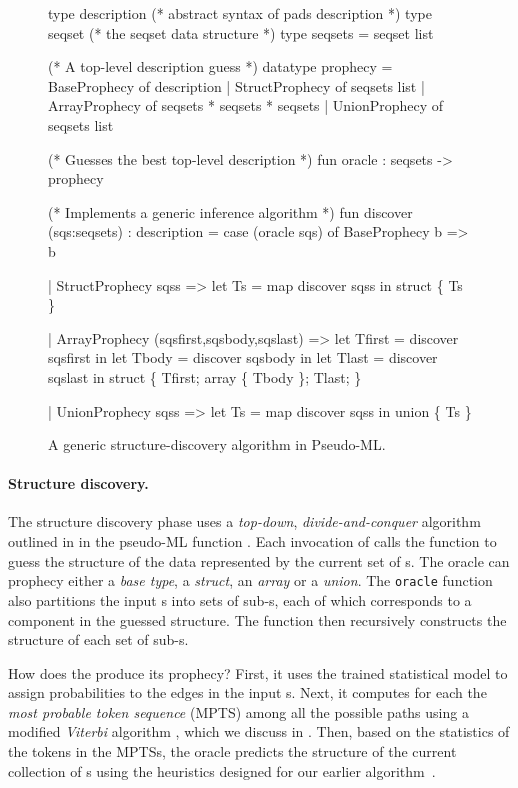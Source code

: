 \begin{figure}[t]
\begin{centercode}
type description  (* abstract syntax of pads description *)
type seqset       (* the seqset data structure *)
type seqsets = seqset list

(* A top-level description guess *)
datatype prophecy =
   BaseProphecy   of description
 | StructProphecy of seqsets list 
 | ArrayProphecy  of seqsets * seqsets * seqsets
 | UnionProphecy  of seqsets list

(* Guesses the best top-level description *)
fun oracle : seqsets -> prophecy

(* Implements a generic inference algorithm *)
fun discover (sqs:seqsets) : description =
 case (oracle sqs) of
   BaseProphecy b => b

 | StructProphecy sqss => 
     let Ts = map discover sqss in
     struct \{ Ts \}

 | ArrayProphecy (sqsfirst,sqsbody,sqslast) => 
     let Tfirst = discover sqsfirst in
     let Tbody  = discover sqsbody  in
     let Tlast  = discover sqslast  in
     struct \{ Tfirst; array \{ Tbody \}; Tlast; \}

 | UnionProphecy sqss => 
     let Ts = map discover sqss in
     union \{ Ts \}
\end{centercode}
\caption{A generic structure-discovery algorithm in Pseudo-ML.} 
\label{fig:structure-discovery}
\end{figure}

\paragraph*{Structure discovery.}
The structure discovery phase uses a {\em top-down}, {\em
divide-and-conquer} algorithm outlined in 
 in the pseudo-ML function
.  Each invocation of 
calls the  function to guess the structure of the data represented
by the current set of \seqset{}s.  The oracle can prophecy
either a {\em base type}, a {\em struct}, an {\em array} or a {\em union}.
The {\tt oracle} function also partitions the input \seqset{}s into
sets of sub-\seqset{}s, each of which corresponds to a component in
the guessed structure.  The  function then recursively 
constructs the structure of each set of sub-\seqset{}s.

How does the  produce its prophecy?
First, it uses the trained statistical model to assign probabilities
to the edges in the input \seqset{}s.
Next, it computes for each \seqset{} the {\em most probable token
sequence} (MPTS) among all the possible paths 
using a modified {\em Viterbi} algorithm \cite{rabiner89:hmm},
which we discuss in .
Then, based on the statistics of the tokens in the MPTSs,
the oracle predicts the structure of the current collection of
\seqset{}s using the heuristics designed for our earlier
algorithm~\cite{fisher+:dirttoshovels}. 


